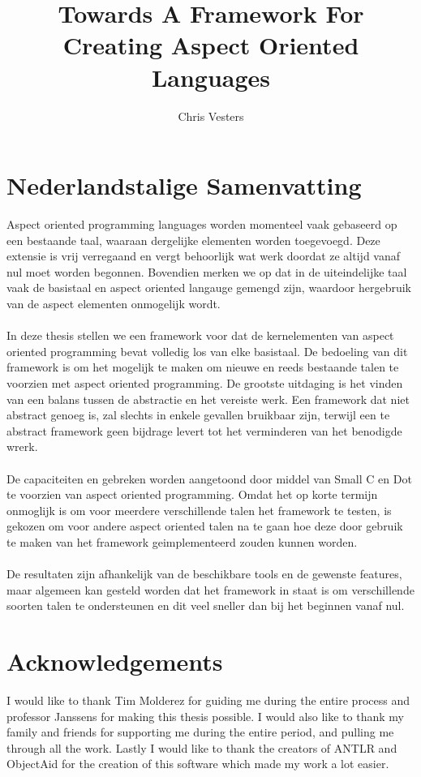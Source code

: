 \documentclass[a4paper]{report}
\title{Towards A Framework For Creating Aspect Oriented Languages}
\author{Chris Vesters}
\begin{document}
\frontpages

\clearpage 
{} 
{}
\chapter*{Nederlandstalige Samenvatting}
Aspect oriented programming languages worden momenteel vaak gebaseerd op een bestaande taal, waaraan dergelijke elementen worden toegevoegd. Deze extensie is vrij verregaand en vergt behoorlijk wat werk doordat ze altijd vanaf nul moet worden begonnen. Bovendien merken we op dat in de uiteindelijke taal vaak de basistaal en aspect oriented langauge gemengd zijn, waardoor hergebruik van de aspect elementen onmogelijk wordt.\\
\\
In deze thesis stellen we een framework voor dat de kernelementen van aspect oriented programming bevat volledig los van elke basistaal. De bedoeling van dit framework is om het mogelijk te maken om nieuwe en reeds bestaande talen te voorzien met aspect oriented programming. De grootste uitdaging is het vinden van een balans tussen de abstractie en het vereiste werk. Een framework dat niet abstract genoeg is, zal slechts in enkele gevallen bruikbaar zijn, terwijl een te abstract framework geen bijdrage levert tot het verminderen van het benodigde wrerk.\\
\\
De capaciteiten en gebreken worden aangetoond door middel van Small C en Dot te voorzien van aspect oriented programming. Omdat het op korte termijn onmoglijk is om voor meerdere verschillende talen het framework te testen, is gekozen om voor andere aspect oriented talen na te gaan hoe deze door gebruik te maken van het framework geimplementeerd zouden kunnen worden.\\
\\
De resultaten zijn afhankelijk van de beschikbare tools en de gewenste features, maar algemeen kan gesteld worden dat het framework in staat is om verschillende soorten talen te ondersteunen en dit veel sneller dan bij het beginnen vanaf nul.

\clearpage 
{} 
{}
\chapter*{Acknowledgements}
I would like to thank Tim Molderez for guiding me during the entire process and professor Janssens for making this thesis possible. I would also like to thank my family and friends for supporting me during the entire period, and pulling me through all the work. Lastly I would like to thank the creators of ANTLR and ObjectAid for the creation of this software which made my work a lot easier.
\clearpage 
{} 
{}
\end{document}
